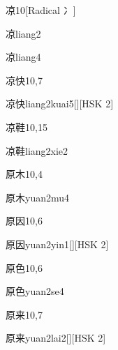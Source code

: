 \begin{entry}{凉}{10}[Radical 冫]
  \begin{phonetics}{凉}{liang2}
  \end{phonetics}
  \begin{phonetics}{凉}{liang4}
  \end{phonetics}
\end{entry}

\begin{entry}{凉快}{10,7}
  \begin{phonetics}{凉快}{liang2kuai5}[][HSK 2]
  \end{phonetics}
\end{entry}

\begin{entry}{凉鞋}{10,15}
  \begin{phonetics}{凉鞋}{liang2xie2}
  \end{phonetics}
\end{entry}

\begin{entry}{原木}{10,4}
  \begin{phonetics}{原木}{yuan2mu4}
  \end{phonetics}
\end{entry}

\begin{entry}{原因}{10,6}
  \begin{phonetics}{原因}{yuan2yin1}[][HSK 2]
  \end{phonetics}
\end{entry}

\begin{entry}{原色}{10,6}
  \begin{phonetics}{原色}{yuan2se4}
  \end{phonetics}
\end{entry}

\begin{entry}{原来}{10,7}
  \begin{phonetics}{原来}{yuan2lai2}[][HSK 2]
  \end{phonetics}
\end{entry}

